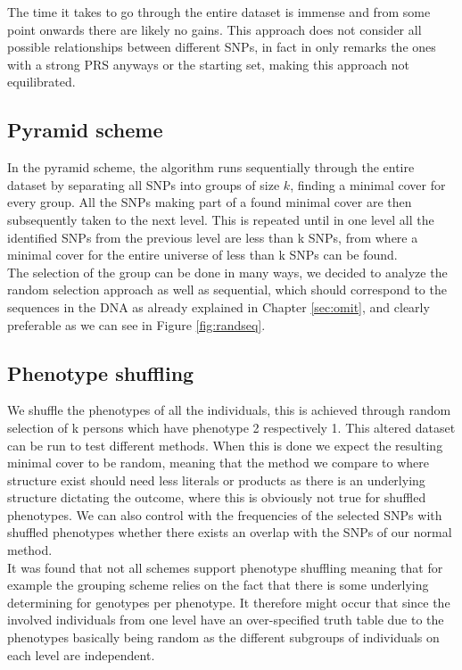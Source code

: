 \documentclass[letterpaper, 11pt]{article}
\begin{document}
The time it takes to go through the entire dataset is immense and from some point onwards there are likely no gains. This approach does not consider all possible relationships between different SNPs, in fact in only remarks the ones with a strong PRS anyways or the starting set, making this approach not equilibrated. 



\subsection{Pyramid scheme}
In the pyramid scheme, the algorithm runs sequentially  through the entire dataset by separating all SNPs into groups of size $k$, finding a minimal cover for every group. All the SNPs making part of a found minimal cover are then subsequently taken to the next level. This is repeated until in one level  all the identified SNPs from the previous level are less than k SNPs, from where a minimal cover for the entire universe of less than k SNPs can be found. \\

The selection of the group can be done in many ways, we decided to analyze the random selection approach as well as sequential, which should correspond to the sequences in the DNA as already explained in Chapter \ref{sec:omit}, and clearly preferable as we can see in Figure \ref{fig:randseq}.


\subsection{Phenotype shuffling}
We shuffle the phenotypes of all the individuals, this is achieved through random selection of k persons which have phenotype 2 respectively 1. 
This altered dataset can be run to test different methods. When this is done we expect the resulting minimal cover to be random, meaning that the method we compare to where structure exist should need less literals or products as there is an underlying structure dictating the outcome, where this is obviously not true for shuffled phenotypes. We can also control with the frequencies of the selected SNPs with shuffled phenotypes whether there exists an overlap with the SNPs of our normal method. \\
It was found that not all schemes support phenotype shuffling meaning that for example the grouping scheme relies on the fact that there is some underlying determining for genotypes per phenotype. It therefore might occur that since the involved individuals from one level have an over-specified truth table due to the phenotypes basically being random as the different subgroups of individuals on each level are independent.  \\
\end{document}

